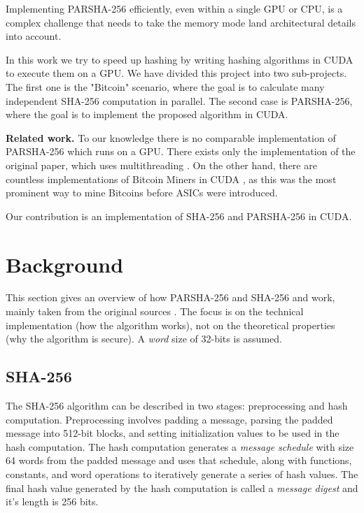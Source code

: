 \documentclass[letterpaper]{article}
\newcommand{\mypar}[1]{{\bf #1.}}
\begin{document}
Implementing PARSHA-256 efficiently,  even  within  a  single GPU or CPU, is a complex challenge that needs to take the memory mode land architectural details into account.

In this work we try to speed up hashing by writing hashing algorithms in CUDA \cite{cuda} to execute them on a GPU. We have divided this project into two sub-projects. The first one is the "Bitcoin" scenario, where the goal is to calculate many independent SHA-256 computation in parallel. The second case is PARSHA-256, where the goal is to implement the proposed algorithm in CUDA. 

\mypar{Related work} To our knowledge there is no comparable implementation of PARSHA-256 which runs on a GPU. There exists only the implementation of the original paper, which uses multithreading \cite{parsha256}. 
On the other hand, there are countless implementations of Bitcoin Miners in CUDA \cite{cbuchner,geedo}, as this was the most prominent way to mine Bitcoins before ASICs were introduced. 

Our contribution is an implementation of SHA-256 and PARSHA-256 in CUDA.

\section{Background}\label{sec:background}

This section gives an overview of how PARSHA-256 and SHA-256 and work, mainly taken from the original sources \cite{sha,parsha256}. The focus is on the technical implementation (how the algorithm works), not on the theoretical properties (why the algorithm is secure). A \emph{word} size of 32-bits is assumed.

\subsection{SHA-256 \cite{sha}}

The SHA-256 algorithm can be described in two stages: preprocessing and hash computation.  Preprocessing involves padding a message, parsing the padded message into 512-bit blocks, and setting initialization values to be used in the hash computation.  The hash computation generates a \emph{message schedule} with size 64 words from the padded message and uses that schedule, along with functions, constants, and word operations to iteratively generate a series of hash values.  The final hash value generated by the hash computation is called a \emph{message digest} and it's length is 256 bits.\\
\end{document}

